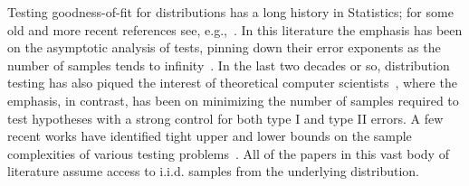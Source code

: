 Testing goodness-of-fit for distributions has a long history in Statistics; for some old and more recent references see, e.g.,~\cite{Pearson00,Fisher35,RaoS81,Agresti11}. 
In this literature the emphasis has been on the asymptotic analysis of tests, pinning down their error exponents as the number of samples tends to infinity~\cite{Agresti11,TanAW10}. In 
the last two decades or so, distribution testing has also piqued the interest of theoretical computer scientists~\cite{BatuFFKRW01,Paninski08,LeviRR13,ValiantV14,ChanDVV14, AcharyaDK15,CanonneDGR15,DiakonikolasK16,DaskalakisDSVV13,CanonneRS14,Rubinfeld12,Goldreich11,Canonne15}, where the emphasis, in contrast, has been on minimizing the number of samples required to test hypotheses with a strong control for both type I and type II errors. A few recent works have identified tight upper and lower bounds on the sample complexities of various testing problems~\cite{Paninski08,ValiantV14,AcharyaDK15,DiakonikolasK16}. All of the papers in this vast body of literature assume access to i.i.d. samples from the underlying distribution. 


